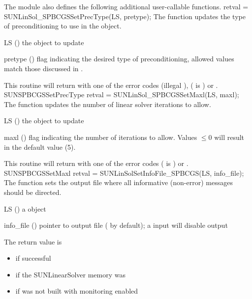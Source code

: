 The {\sunlinsolspbcgs} module also defines the following additional
user-callable functions.
%
%
{
  retval = SUNLinSol\_SPBCGSSetPrecType(LS, pretype);
}
{
  The function  updates the type of
  preconditioning to use in the {\sunlinsolspbcgs} object.
}
{
  \begin{args}[pretype]
  \item[LS] ()
    the {\sunlinsolspbcgs} object to update
  \item[pretype] ()
    flag indicating the desired type of preconditioning, allowed
    values match those discussed in .
  \end{args}
}
{
  This routine will return with one of the error codes
   (illegal ), 
  ( is ) or .
}
{}
{SUNSPBCGSSetPrecType}
%
%
{
  retval = SUNLinSol\_SPBCGSSetMaxl(LS, maxl);
}
{
  The function  updates the number of
  linear solver iterations to allow.
}
{
  \begin{args}[maxl]
  \item[LS] ()
    the {\sunlinsolspbcgs} object to update
  \item[maxl] ()
    flag indicating the number of iterations to allow. Values $\le0$
    will result in the default value (5).
  \end{args}
}
{
  This routine will return with one of the error codes
   ( is ) or .
}
{}
{SUNSPBCGSSetMaxl}
%
%
{
  retval = SUNLinSolSetInfoFile\_SPBCGS(LS, info\_file);
}
{
  The function  sets the
  output file where all informative (non-error) messages should be directed.
}
{
  \begin{args}
    \item[LS] ()
      a {\sunnonlinsol} object
    \item[info\_file] () pointer to output file ( by default);
      a  input will disable output
  \end{args}
}
{
  The return value is
  \begin{itemize}
    \item {} if successful
    \item {} if the SUNLinearSolver memory was 
    \item {} if {\sundials} was not built with monitoring enabled
  \end{itemize}
}
